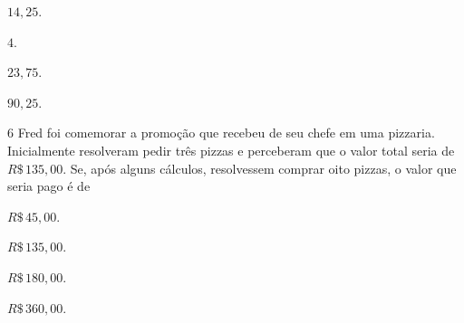 \begin{escolha}
\item $14,25$.
\item $4$.
\item $23,75$.
\item $90,25$.
\end{escolha}



\num{6}  Fred foi comemorar a promoção que recebeu de seu chefe em uma
pizzaria. Inicialmente resolveram pedir três pizzas e perceberam que o
valor total seria de $R\$\,135,00$. Se, após alguns cálculos, resolvessem
comprar oito pizzas, o valor que seria pago é de

\begin{escolha}
\item $R\$\,45,00$.
\item $R\$\,135,00$.
\item $R\$\,180,00$.
\item $R\$\,360,00$.
\end{escolha}



